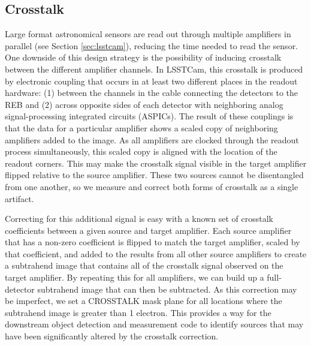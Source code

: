 \subsection{Crosstalk} \label{sec:processing:calibration:xtalk}
Large format astronomical sensors are read out through multiple amplifiers in parallel (see Section \ref{sec:lsstcam}), reducing the time needed to read the sensor.
One downside of this design strategy is the possibility of inducing crosstalk between the different amplifier channels.
In LSSTCam, this crosstalk is produced by electronic coupling that occurs in at least two different places in the readout hardware: (1) between the channels in the cable connecting the detectors to the REB and (2) across opposite sides of each detector with neighboring analog signal-processing integrated circuits (ASPICs). 
The result of these couplings is that the data for a particular amplifier shows a scaled copy of neighboring amplifiers added to the image.
As all amplifiers are clocked through the readout process simultaneously, this scaled copy is aligned with the location of the readout corners.
This may make the crosstalk signal visible in the target amplifier flipped relative to the source amplifier.
These two sources cannot be disentangled from one another, so we measure and correct both forms of crosstalk as a single artifact.

Correcting for this additional signal is easy with a known set of crosstalk coefficients between a given source and target amplifier. Each source amplifier that has a non-zero coefficient is flipped to match the target amplifier, scaled by that coefficient, and added to the results from all other source amplifiers to create a subtrahend image that contains all of the crosstalk signal observed on the target amplifier.
By repeating this for all amplifiers, we can build up a full-detector subtrahend image that can then be subtracted.
As this correction may be imperfect, we set a CROSSTALK mask plane for all locations where the subtrahend image is greater than 1 electron.
This provides a way for the downstream object detection and measurement code to identify sources that may have been significantly altered by the crosstalk correction.

